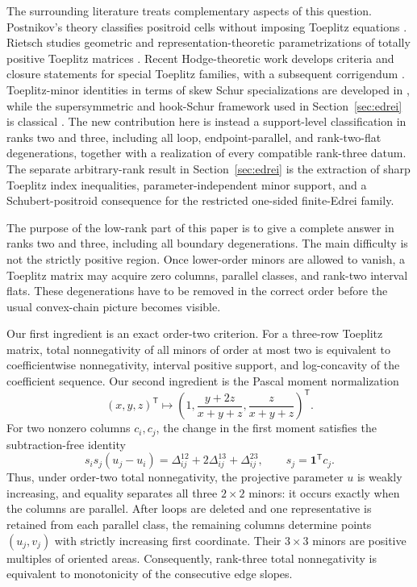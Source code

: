 \documentclass{amsart}
\numberwithin{equation}{section}
\theoremstyle{definition}
\theoremstyle{remark}
\newcommand{\transpose}{\mathsf T}
\begin{document}
The surrounding literature treats complementary aspects of this question.  Postnikov's theory classifies positroid cells without imposing Toeplitz equations \cite{Postnikov}.  Rietsch studies geometric and representation-theoretic parametrizations of totally positive Toeplitz matrices \cite{Rietsch,RietschSurvey}.  Recent Hodge-theoretic work develops criteria and closure statements for special Toeplitz families, with a subsequent corrigendum \cite{HigherLorentzian,HigherLorentzianCorrigendum,McDaniel}.  Toeplitz-minor identities in terms of skew Schur specializations are developed in \cite{GarciaTierz}, while the supersymmetric and hook-Schur framework used in Section~\ref{sec:edrei} is classical \cite{BereleRegev,Stembridge,Macdonald}.  The new contribution here is instead a support-level classification in ranks two and three, including all loop, endpoint-parallel, and rank-two-flat degenerations, together with a realization of every compatible rank-three datum.  The separate arbitrary-rank result in Section~\ref{sec:edrei} is the extraction of sharp Toeplitz index inequalities, parameter-independent minor support, and a Schubert-positroid consequence for the restricted one-sided finite-Edrei family.

The purpose of the low-rank part of this paper is to give a complete answer in ranks two and three, including all boundary degenerations.  The main difficulty is not the strictly positive region.  Once lower-order minors are allowed to vanish, a Toeplitz matrix may acquire zero columns, parallel classes, and rank-two interval flats.  These degenerations have to be removed in the correct order before the usual convex-chain picture becomes visible.

Our first ingredient is an exact order-two criterion.  For a three-row Toeplitz matrix, total nonnegativity of all minors of order at most two is equivalent to coefficientwise nonnegativity, interval positive support, and log-concavity of the coefficient sequence.  Our second ingredient is the Pascal moment normalization
\[
 (x,y,z)^{\transpose}
 \longmapsto
 \left(1,\frac{y+2z}{x+y+z},\frac{z}{x+y+z}\right)^{\transpose}.
\]
For two nonzero columns $c_i,c_j$, the change in the first moment satisfies the subtraction-free identity
\[
 s_is_j(u_j-u_i)
 =\Delta^{12}_{ij}+2\Delta^{13}_{ij}+\Delta^{23}_{ij},
 \qquad s_j=\mathbf 1^{\transpose}c_j.
\]
Thus, under order-two total nonnegativity, the projective parameter $u$ is weakly increasing, and equality separates all three $2\times2$ minors: it occurs exactly when the columns are parallel.  After loops are deleted and one representative is retained from each parallel class, the remaining columns determine points $(u_j,v_j)$ with strictly increasing first coordinate.  Their $3\times3$ minors are positive multiples of oriented areas.  Consequently, rank-three total nonnegativity is equivalent to monotonicity of the consecutive edge slopes.
\end{document}
